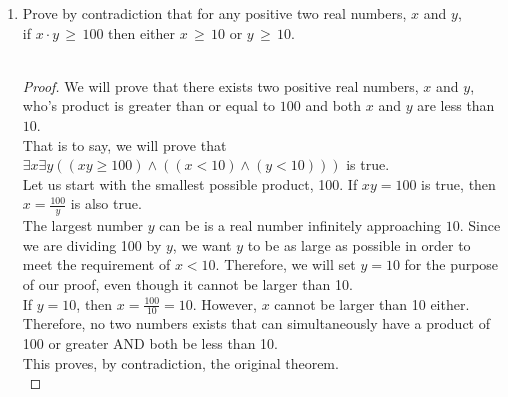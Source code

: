 \documentclass{amsart}
\theoremstyle{definition}
\theoremstyle{Exercise}
\theoremstyle{remark}
\theoremstyle{rule}
\numberwithin{equation}{section}
\begin{document}
\begin{enumerate}[label=(\alph*)]
\begin{proof}
  Therefore, if $x + y$ is rational, then $x$ is irrational or $y$ is rational.\\
  \end{proof}
\\\\\\\\
    \item Prove by contradiction that for any positive two real numbers, $x$ and $y$,\\
         if $x\cdot y\, \geq \,100$ then either $x\, \geq \,10$ or $y\, \geq \, 10$.
          \\\\
  \begin{proof}
  We will prove that there exists two positive real numbers, $x$ and $y$, who's product is greater than or equal to $100$ and both $x$ and $y$ are less than $10$.\\
  That is to say, we will prove that $\exists x \exists y ((xy \geq 100) \land ((x < 10) \land (y < 10)))$ is true.\\
  Let us start with the smallest possible product, 100. If $xy = 100$ is true, then $x = \frac{100}{y}$ is also true.\\
  The largest number $y$ can be is a real number infinitely approaching $10$. Since we are dividing 100 by $y$, we want $y$ to be as large as possible in order to meet the requirement of $x < 10$. Therefore, we will set $y = 10$ for the purpose of our proof, even though it cannot be larger than 10.\\
  If $y = 10$, then $x = \frac{100}{10} = 10$. However, $x$ cannot be larger than 10 either.\\
  Therefore, no two numbers exists that can simultaneously have a product of 100 or greater AND both be less than 10.\\
  This proves, by contradiction, the original theorem.\\
  \end{proof}
\\\\
  \end{enumerate}
  \newpage
\end{document}
